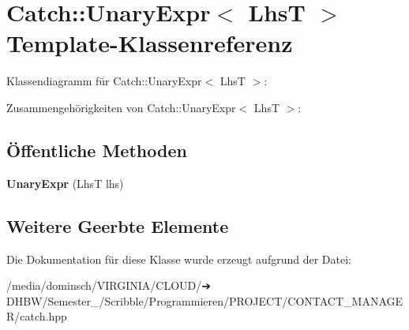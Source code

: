 \hypertarget{classCatch_1_1UnaryExpr}{}\section{Catch\+:\+:Unary\+Expr$<$ LhsT $>$ Template-\/\+Klassenreferenz}
\label{classCatch_1_1UnaryExpr}


Klassendiagramm für Catch\+:\+:Unary\+Expr$<$ LhsT $>$\+:


Zusammengehörigkeiten von Catch\+:\+:Unary\+Expr$<$ LhsT $>$\+:
\subsection*{Öffentliche Methoden}
\begin{DoxyCompactItemize}
\item 
\mbox{\label{classCatch_1_1UnaryExpr_ae02f666a1e64da728628aa2033e1d6e7}} 
{\bfseries Unary\+Expr} (LhsT lhs)
\end{DoxyCompactItemize}
\subsection*{Weitere Geerbte Elemente}


Die Dokumentation für diese Klasse wurde erzeugt aufgrund der Datei\+:\begin{DoxyCompactItemize}
\item 
/media/dominsch/\+V\+I\+R\+G\+I\+N\+I\+A/\+C\+L\+O\+U\+D/➔ D\+H\+B\+W/\+Semester\+\_/\+Scribble/\+Programmieren/\+P\+R\+O\+J\+E\+C\+T/\+C\+O\+N\+T\+A\+C\+T\+\_\+\+M\+A\+N\+A\+G\+E\+R/catch.\+hpp\end{DoxyCompactItemize}
